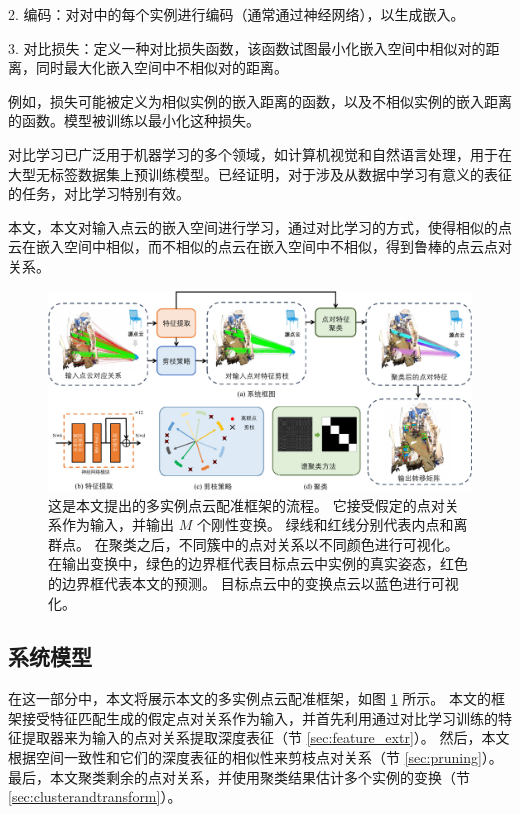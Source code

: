 2. 编码：对对中的每个实例进行编码（通常通过神经网络），以生成嵌入。

3. 对比损失：定义一种对比损失函数，该函数试图最小化嵌入空间中相似对的距离，同时最大化嵌入空间中不相似对的距离。

例如，损失可能被定义为相似实例的嵌入距离的函数，以及不相似实例的嵌入距离的函数。模型被训练以最小化这种损失。

对比学习已广泛用于机器学习的多个领域，如计算机视觉和自然语言处理，用于在大型无标签数据集上预训练模型。已经证明，对于涉及从数据中学习有意义的表征的任务，对比学习特别有效\cite{tian2020makes}。

本文，本文对输入点云的嵌入空间进行学习，通过对比学习的方式，使得相似的点云在嵌入空间中相似，而不相似的点云在嵌入空间中不相似，得到鲁棒的点云点对关系。

\begin{figure}[ht]
    \centering
    \includegraphics[width=1.0\textwidth]{images/pointcorr.pdf}
    \caption{
        这是本文提出的多实例点云配准框架的流程。
        它接受假定的点对关系作为输入，并输出 $M$ 个刚性变换。
        绿线和红线分别代表内点和离群点。
        在聚类之后，不同簇中的点对关系以不同颜色进行可视化。
        在输出变换中，绿色的边界框代表目标点云中实例的真实姿态，红色的边界框代表本文的预测。
        目标点云中的变换点云以蓝色进行可视化。      
    }
    \label{fig:point-pipeline}
  \end{figure}

\subsection{系统模型}
在这一部分中，本文将展示本文的多实例点云配准框架，如图 \ref{fig:point-pipeline} 所示。
本文的框架接受特征匹配生成的假定点对关系作为输入，并首先利用通过对比学习训练的特征提取器来为输入的点对关系提取深度表征（节 \ref{sec:feature_extr}）。
然后，本文根据空间一致性和它们的深度表征的相似性来剪枝点对关系（节 \ref{sec:pruning}）。
最后，本文聚类剩余的点对关系，并使用聚类结果估计多个实例的变换（节 \ref{sec:clusterandtransform}）。

